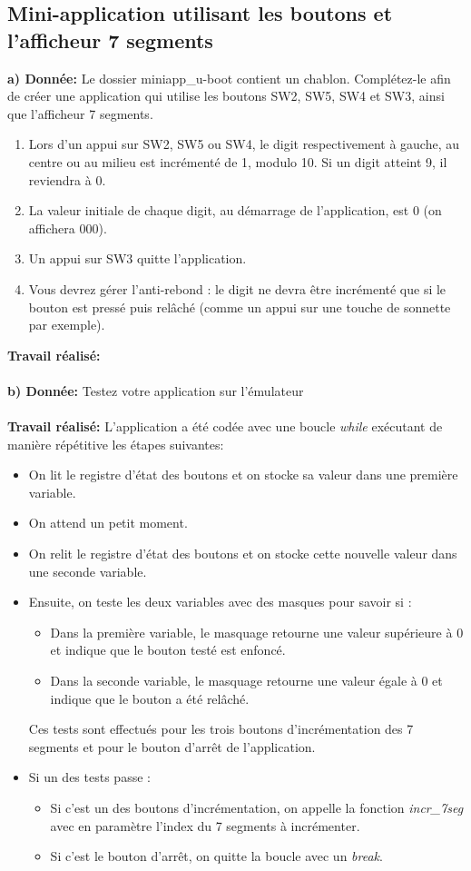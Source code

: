 \subsection{Mini-application utilisant les boutons et l'afficheur 7 segments}
\textbf{a) Donnée: }Le dossier miniapp\_u-boot contient un chablon. Complétez-le afin de créer une application qui
utilise les boutons SW2, SW5, SW4 et SW3, ainsi que l’afficheur 7 segments.
\begin{enumerate}
	\item Lors d’un appui sur SW2, SW5 ou SW4, le digit respectivement à gauche, au centre ou au
	milieu est incrémenté de 1, modulo 10. Si un digit atteint 9, il reviendra à 0. 
	\item La valeur initiale de chaque digit, au démarrage de l’application, est 0 (on affichera 000). 
	\item Un appui sur SW3 quitte l’application. 
	\item Vous devrez gérer l’anti-rebond : le digit ne devra être incrémenté que si le bouton est
	pressé puis relâché (comme un appui sur une touche de sonnette par exemple). \\
\end{enumerate}
\textbf{Travail réalisé: }\\\\
\textbf{b) Donnée: }Testez votre application sur l’émulateur\\\\
\textbf{Travail réalisé: }L'application a été codée avec une boucle \textit{while} exécutant de manière répétitive les étapes suivantes:
\begin{itemize}
	\item On lit le registre d'état des boutons et on stocke sa valeur dans une première variable. 
	\item On attend un petit moment.
	\item On relit le registre d'état des boutons et on stocke cette nouvelle valeur dans une seconde variable.
	\item Ensuite, on teste les deux variables avec des masques pour savoir si :
	\begin{itemize}
		\item Dans la première variable, le masquage retourne une valeur supérieure à 0 et indique que le bouton testé est enfoncé.
		\item Dans la seconde variable, le masquage retourne une valeur égale à 0 et indique que le bouton a été relâché. 
	\end{itemize}
	Ces tests sont effectués pour les trois boutons d'incrémentation des 7 segments et pour le bouton d'arrêt de l'application. 
	\item Si un des tests passe :
	\begin{itemize}
		\item Si c'est un des boutons d'incrémentation, on appelle la fonction \textit{incr\_7seg} avec en paramètre l'index du 7 segments à incrémenter.
		\item Si c'est le bouton d'arrêt, on quitte la boucle avec un \textit{break}.\\
	\end{itemize}
\end{itemize}
